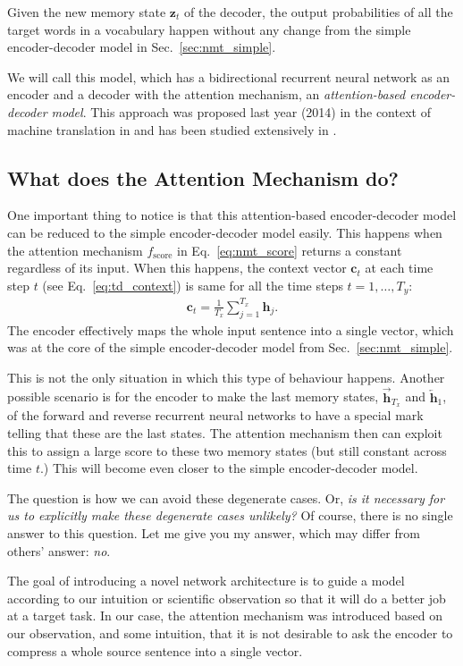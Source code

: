 \documentclass{report}
\newcommand{\vect}[1]{\mathbf{#1}}
\newcommand{\vc}[0]{\vect{c}}
\newcommand{\vh}[0]{\vect{h}}
\newcommand{\vz}[0]{\vect{z}}
\begin{document}
Given the new memory state $\vz_t$ of the decoder, the output probabilities of
all the target words in a vocabulary happen without any change from the simple
encoder-decoder model in Sec.~\ref{sec:nmt_simple}.

We will call this model, which has a bidirectional recurrent neural network as
an encoder and a decoder with the attention mechanism, an {\em attention-based
encoder-decoder model}. This approach was proposed last year (2014) in the
context of machine translation in \cite{bahdanau2014neural} and has been studied
extensively in \cite{luong2015effective}.


\subsection{What does the Attention Mechanism do?}

One important thing to notice is that this attention-based encoder-decoder model
can be reduced to the simple encoder-decoder model easily. This happens when the
attention mechanism $f_{\text{score}}$ in Eq.~\eqref{eq:nmt_score} returns a
constant regardless of its input. When this happens, the context vector $\vc_t$
at each time step $t$ (see Eq.~\eqref{eq:td_context}) is same for all the time
steps $t=1,\ldots,T_y$:
\begin{align*}
    \vc_t = \frac{1}{T_x} \sum_{j=1}^{T_x} \vh_j.
\end{align*}
The encoder effectively maps the whole input sentence into a single vector,
which was at the core of the simple encoder-decoder model from
Sec.~\ref{sec:nmt_simple}. 

This is not the only situation in which this type of behaviour happens. Another
possible scenario is for the encoder to make the last memory states,
$\overrightarrow{\vh}_{T_x}$ and $\overleftarrow{\vh}_1$, of the forward and
reverse recurrent neural networks to have a special mark telling that these are
the last states. The attention mechanism then can exploit this to assign a large
score to these two memory states (but still constant across time $t$.) This will
become even closer to the simple encoder-decoder model.

The question is how we can avoid these degenerate cases. Or, {\em is it
necessary for us to explicitly make these degenerate cases unlikely?} Of course,
there is no single answer to this question. Let me give you my answer, which may
differ from others' answer: {\em no}.

The goal of introducing a novel network architecture is to guide a model
according to our intuition or scientific observation so that it will do a better
job at a target task. In our case, the attention mechanism was introduced based
on our observation, and some intuition, that it is not desirable to ask the
encoder to compress a whole source sentence into a single vector. 
\end{document}
